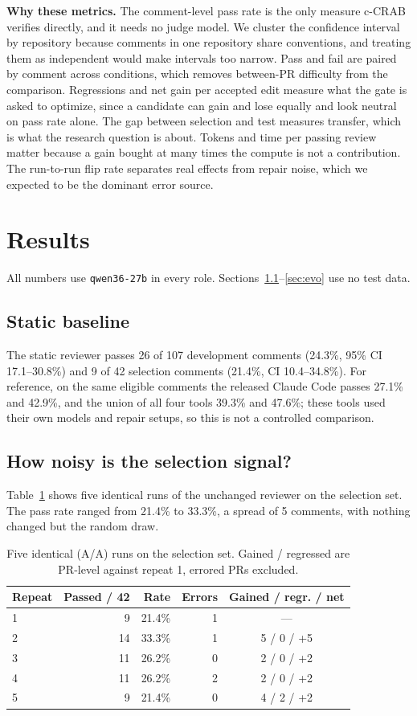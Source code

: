 \documentclass[sigconf, authorversion, nonacm]{acmart}
\begin{document}
\textbf{Why these metrics.} The comment-level pass rate is the only measure c-CRAB verifies directly, and it needs no judge model. We cluster the confidence interval by repository because comments in one repository share conventions, and treating them as independent would make intervals too narrow. Pass and fail are paired by comment across conditions, which removes between-PR difficulty from the comparison. Regressions and net gain per accepted edit measure what the gate is asked to optimize, since a candidate can gain and lose equally and look neutral on pass rate alone. The gap between selection and test measures transfer, which is what the research question is about. Tokens and time per passing review matter because a gain bought at many times the compute is not a contribution. The run-to-run flip rate separates real effects from repair noise, which we expected to be the dominant error source.

\section{Results}
All numbers use \texttt{qwen36-27b} in every role. Sections~\ref{sec:static}--\ref{sec:evo} use no test data.

\subsection{Static baseline}\label{sec:static}
The static reviewer passes 26 of 107 development comments (24.3\%, 95\% CI 17.1--30.8\%) and 9 of 42 selection comments (21.4\%, CI 10.4--34.8\%). For reference, on the same eligible comments the released Claude Code passes 27.1\% and 42.9\%, and the union of all four tools 39.3\% and 47.6\%; these tools used their own models and repair setups, so this is not a controlled comparison.

\subsection{How noisy is the selection signal?}\label{sec:calib}
Table~\ref{tab:calib} shows five identical runs of the unchanged reviewer on the selection set. The pass rate ranged from 21.4\% to 33.3\%, a spread of 5 comments, with nothing changed but the random draw.

\begin{table}[t]
\caption{Five identical (A/A) runs on the selection set. Gained / regressed are PR-level against repeat 1, errored PRs excluded.}
\label{tab:calib}
\small
\begin{tabular}{lrrrc}
\toprule
Repeat & Passed / 42 & Rate & Errors & Gained / regr. / net \\
\midrule
1 & 9 & 21.4\% & 1 & --- \\
2 & 14 & 33.3\% & 1 & 5 / 0 / +5 \\
3 & 11 & 26.2\% & 0 & 2 / 0 / +2 \\
4 & 11 & 26.2\% & 2 & 2 / 0 / +2 \\
5 & 9 & 21.4\% & 0 & 4 / 2 / +2 \\
\bottomrule
\end{tabular}
\end{table}
\end{document}
